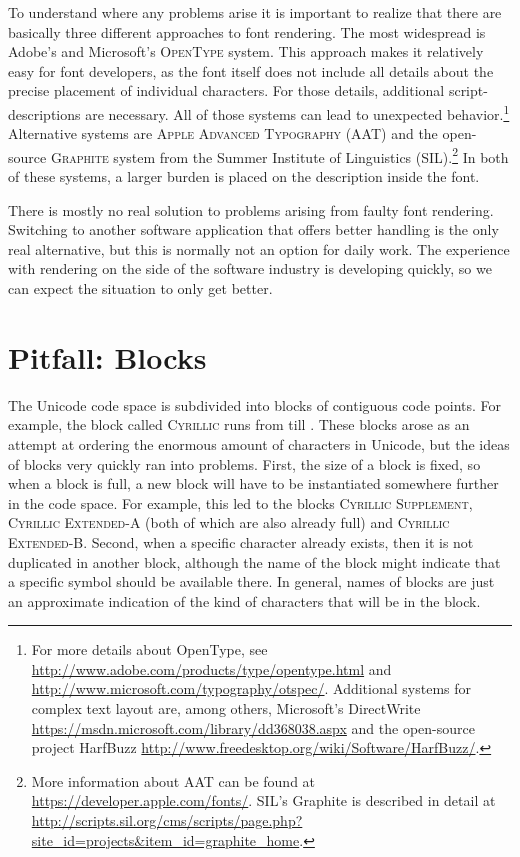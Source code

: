 To understand where any problems arise it is important to realize that there are
basically three different approaches to font rendering. The most widespread is
Adobe's and Microsoft's \textsc{OpenType} system. This approach makes it
relatively easy for font developers, as the font itself does not include all
details about the precise placement of individual characters. For those details,
additional script-descriptions are necessary. All of those systems can lead to
unexpected behavior.\footnote{For more details about OpenType, see
\url{http://www.adobe.com/products/type/opentype.html} and
\url{http://www.microsoft.com/typography/otspec/}. Additional systems for
complex text layout are, among others, Microsoft's DirectWrite
\url{https://msdn.microsoft.com/library/dd368038.aspx} and the open-source
project HarfBuzz \url{http://www.freedesktop.org/wiki/Software/HarfBuzz/}.}
Alternative systems are \textsc{Apple Advanced Typography} (AAT) and the
open-source \textsc{Graphite} system from the Summer Institute of Linguistics
(SIL).\footnote{More information about AAT can be found at
\url{https://developer.apple.com/fonts/}. \newline SIL's Graphite is described
in detail at
\url{http://scripts.sil.org/cms/scripts/page.php?site\_id=projects\&item\_id=graphite\_home}.}
In both of these systems, a larger burden is placed on the description inside
the font.

There is mostly no real solution to problems arising from faulty font rendering.
Switching to another software application that offers better handling is the
only real alternative, but this is normally not an option for daily work. The 
experience with rendering on the side of the software industry is developing 
quickly, so we can expect the situation to only get better. %

\section{Pitfall: Blocks}
\label{pitfall-blocks}

The Unicode code space is subdivided into blocks of contiguous code points. For
example, the block called \textsc{Cyrillic} runs from  till
. These blocks arose as an attempt at ordering the enormous amount of
characters in Unicode, but the ideas of blocks very quickly ran into problems.
First, the size of a block is fixed, so when a block is full, a new block will
have to be instantiated somewhere further in the code space. For example, this
led to the blocks \textsc{Cyrillic Supplement}, \textsc{Cyrillic Extended-A}
(both of which are also already full) and \textsc{Cyrillic Extended-B}. Second,
when a specific character already exists, then it is not duplicated in another
block, although the name of the block might indicate that a specific symbol
should be available there. In general, names of blocks are just an approximate
indication of the kind of characters that will be in the block.

